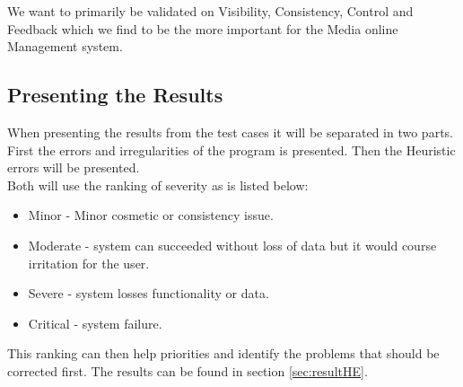 We want to primarily be validated on Visibility, Consistency, Control and Feedback which we find to be the more important for the Media online Management system.

\subsection{Presenting the Results}
When presenting the results from the test cases it will be separated in two parts. First the errors and irregularities of the program is presented. Then the Heuristic errors will be presented.\\
Both will use the ranking of severity as is listed below:

\begin{itemize}
    \item Minor - Minor cosmetic or consistency issue.
    \item Moderate - system can succeeded without loss of data but it would course irritation for the user. 
	\item Severe - system losses functionality or data.
    \item Critical - system failure.
\end{itemize}

This ranking can then help priorities and identify the problems that should be corrected first. The results can be found in section \vref{sec:resultHE}.

